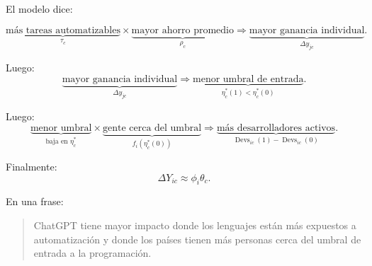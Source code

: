 \documentclass[11pt,a4paper]{article}
\newcommand{\Devs}{\operatorname{Devs}}
\begin{document}
El modelo dice:

\[
\underbrace{\text{más tareas automatizables}}_{\tau_c}
\times
\underbrace{\text{mayor ahorro promedio}}_{\rho_c}
\Longrightarrow
\underbrace{\text{mayor ganancia individual}}_{\Delta y_{jc}}.
\]

Luego:
\[
\underbrace{\text{mayor ganancia individual}}_{\Delta y_{jc}}
\Longrightarrow
\underbrace{\text{menor umbral de entrada}}_{\eta_c^*(1)<\eta_c^*(0)}.
\]

Luego:
\[
\underbrace{\text{menor umbral}}_{\text{baja en }\eta_c^*}
\times
\underbrace{\text{gente cerca del umbral}}_{f_i(\eta_c^*(0))}
\Longrightarrow
\underbrace{\text{más desarrolladores activos}}_{\Devs_{ic}(1)-\Devs_{ic}(0)}.
\]

Finalmente:
\[
\Delta Y_{ic}\approx \phi_i\theta_c.
\]

En una frase:

\begin{quote}
ChatGPT tiene mayor impacto donde los lenguajes están más expuestos a automatización y donde los países tienen más personas cerca del umbral de entrada a la programación.
\end{quote}
\end{document}
